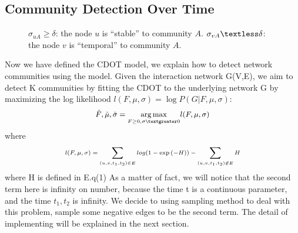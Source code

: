 \subsection{Community Detection Over Time}
\label{subsec:detection}
\begin{figure}[th]
	\centering
	\caption{$\sigma_{uA} \ge \delta$: the node $u$ is ``stable'' to community $A$. $\sigma_{vA} \textless \delta$: the node $v$ is ``temporal'' to community $A$.}
	\label{fig:model}
\end{figure}
Now we have defined the CDOT model, we explain how to detect network communities using the model.  Given the interaction network G(V,E), we aim to detect K communities by fitting the CDOT to the underlying network G by maximizing the log likelihood $l(F,\mu,\sigma) =\log P(G|F,\mu,\sigma)$:
\begin{equation}
\small
\begin{aligned}
&\hat{F},\hat{\mu},\hat{\sigma} = \underset{F\ge 0,  \sigma\textgreater 0}{\arg\max}  l(F,\mu,\sigma)\\
\end{aligned}
\end{equation}
where 
\begin{equation}
\scriptsize
\begin{aligned}
l(F,\mu,\sigma) = \sum_{(u,v,t_1,t_2)\in E} log(1-\exp{(-H)})-\sum_{(u,v,t_1,t_2)\not\in E}H
\end{aligned}
\end{equation}
where H is defined in E.q(1)
As a matter of fact, we will notice that the second term here is infinity on number, because the time t is a continuous parameter, and the time $t_1, t_2$ is infinity. We decide to using sampling method to deal with this problem, sample some negative edges to be the second term. The detail of implementing will be explained in the next section.
